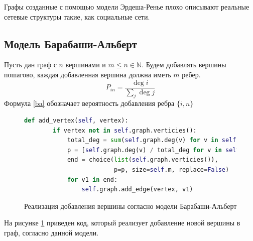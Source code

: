 Графы созданные с помощью модели Эрдеша-Ренье плохо
описывают реальные сетевые структуры такие, как 
социальные сети. 
\subsection{Модель Барабаши-Альберт}
Пусть дан граф с $n$ вершинами и  $m \le n \in \mathbb{N}$.
Будем добавлять вершины пошагово, 
каждая добавленная вершина должна 
иметь $m$ ребер. 
 \begin{equation}
     P_{in} = \frac{\deg{i}}{ \sum_{j} \deg{j}}
     \label{ba}
\end{equation} 
Формула \ref{ba} обозначает вероятность добавления ребра
$\{i,n\}$
\begin{figure}[H] 
\begin{lstlisting}[language=Python] 
    def add_vertex(self, vertex):
        if vertex not in self.graph.verticies():
            total_deg = sum(self.graph.deg(v) for v in self.graph.verticies())
            p = [self.graph.deg(v) / total_deg for v in self.graph.verticies()]
            end = choice(list(self.graph.verticies()),
                         p=p, size=self.m, replace=False)
            for v1 in end:
                self.graph.add_edge(vertex, v1)
\end{lstlisting}  
    \caption{Реализация добавления вершины согласно модели Барабаши-Альберт}
    \label{ba_1}
\end{figure} 
На рисунке \ref{ba_1} приведен код, который реализует 
добавление новой вершины в граф, согласно данной модели.
